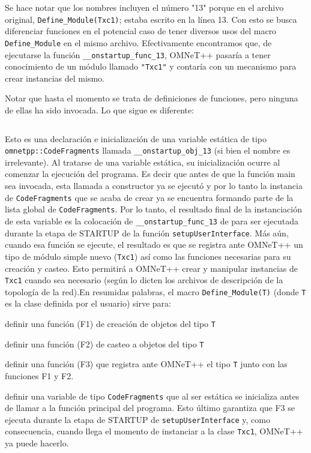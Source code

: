 \documentclass[]{article}
\begin{document}
Se hace notar que los nombres incluyen el número "13" porque en el archivo
original, \verb!Define_Module(Txc1)!; estaba escrito en la línea 13. Con esto
se busca diferenciar funciones en el potencial caso de tener diversos usos del
macro \verb!Define_Module! en el mismo archivo. Efectivamente encontramos que,
de ejecutarse la función \verb!__onstartup_func_13!, OMNeT++ pasaría a tener
conocimiento de un módulo llamado \verb!"Txc1"! y contaría con un mecanismo
para crear instancias del mismo.

Notar que hasta el momento se trata de definiciones de funciones, pero ninguna
de ellas ha sido invocada. Lo que sigue es diferente:

\inputminted{c++}{codelistings/define_module_4.cc}

Esto es una declaración e inicialización de una variable estática de tipo
\verb!omnetpp::CodeFragments! llamada \verb!__onstartup_obj_13! (si bien el
nombre es irrelevante). Al tratarse de una variable estática, su inicialización
ocurre al comenzar la ejecución del programa. Es decir que antes de que la
función main sea invocada, esta llamada a constructor ya se ejecutó y por lo
tanto la instancia de \verb!CodeFragments! que se acaba de crear ya se encuentra
formando parte de la lista global de \verb!CodeFragments!. Por lo tanto, el resultado
final de la instanciación de esta variable es la colocación de
\verb!__onstartup_func_13!  de para ser ejecutada durante la etapa de STARTUP
de la función \verb!setupUserInterface!. Más aún, cuando esa función se ejecute, el
resultado es que se registra ante OMNeT++ un tipo de módulo simple nuevo (\verb!Txc1!) así
como las funciones necesarias para su creación y casteo. Esto permitirá a
OMNeT++ crear y manipular instancias de \verb!Txc1! cuando sea necesario (según lo
dicten los archivos de descripción de la topología de la red).En resumidas
palabras, el macro \verb!Define_Module(T)! (donde \verb!T! es la clase definida por el
usuario) sirve para:

definir una función (F1) de creación de objetos del tipo \verb!T!

definir una función (F2) de casteo a objetos del tipo \verb!T!

definir una función (F3) que registra ante OMNeT++ el tipo \verb!T! junto con
las funciones F1 y F2.

definir una variable de tipo \verb!CodeFragments! que al ser estática se
inicializa antes de llamar a la función principal del programa. Esto último
garantiza que F3 se ejecuta durante la etapa de STARTUP de
\verb!setupUserInterface! y, como consecuencia, cuando llega el momento de
instanciar a la clase \verb!Txc1!, OMNeT++ ya puede hacerlo.
\end{document}
